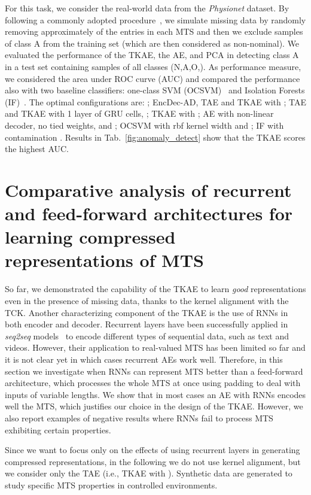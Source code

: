 \documentclass[a4paper,10pt,pdftex]{article}
\begin{document}
For this task, we consider the real-world data from the \textit{Physionet} dataset.
By following a commonly adopted procedure~\cite{doi:10.3102/00346543074004525}, we simulate missing data by randomly removing approximately  of the entries in each MTS and then we exclude samples of class A from the training set (which are then considered as non-nominal).
We evaluated the performance of the TKAE, the AE, and PCA in detecting class A in a test set containing samples of all classes (N,A,O,).
As performance measure, we considered the area under ROC curve (AUC) and compared the performance also with two baseline classifiers: one-class SVM (OCSVM)~\cite{GUERBAI2015103} and Isolation Forests (IF)~\cite{DOMINGUES2018406}. 
The optimal configurations are: ; EncDec-AD, TAE and TKAE with ; TAE and TKAE with 1 layer of GRU cells, ; TKAE with ; AE with non-linear decoder, no tied weights, and ; OCSVM with rbf kernel width  and ; IF with contamination .
Results in Tab.~\ref{fig:anomaly_detect} show that the TKAE scores the highest AUC.




\section{Comparative analysis of recurrent and feed-forward architectures for learning compressed representations of MTS}
\label{sec:analysis}

So far, we demonstrated the capability of the TKAE to learn \textit{good} representations even in the presence of missing data, thanks to the kernel alignment with the TCK.
Another characterizing component of the TKAE is the use of RNNs in both encoder and decoder.
Recurrent layers have been successfully applied in \textit{seq2seq} models~\cite{sutskever2014sequence} to encode different types of sequential data, such as text and videos.
However, their application to real-valued MTS has been limited so far and it is not clear yet in which cases recurrent AEs work well.
Therefore, in this section we investigate when RNNs can represent MTS better than a feed-forward architecture, which processes the whole MTS at once using padding to deal with inputs of variable lengths.
We show that in most cases an AE with RNNs encodes well the MTS, which justifies our choice in the design of the TKAE.
However, we also report examples of negative results where RNNs fail to process MTS exhibiting certain properties.

Since we want to focus only on the effects of using recurrent layers in generating compressed representations, in the following we do not use kernel alignment, but we consider only the TAE (i.e., TKAE with ). Synthetic data are generated to study specific MTS properties in controlled environments.
\end{document}
